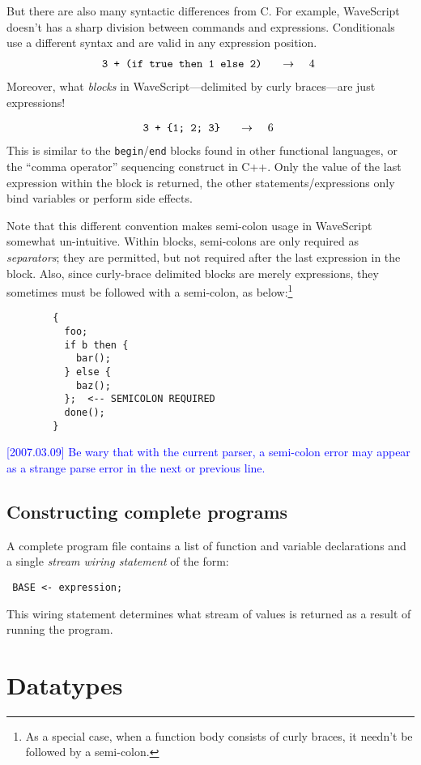\documentclass[twocolumn]{report}
\newcommand{\rednote}[1]{{\textcolor{blue}{#1}}}
\newcommand{\evalsto}[2]{\[ \begin{array}{rcl}
$\tt #1 $&$ \arr $&$ #2 $
\end{array} \]}
\newcommand{\arr}{\ensuremath{\rightarrow}}
\newenvironment{wscode}{\begin{center}\tt}{\end{center}}
\begin{document}
But there are also many syntactic differences from C.  For example,
WaveScript doesn't has a sharp division between commands and
expressions.  Conditionals use a different syntax and are valid in any
expression position.
%
\evalsto{3 + (if true then 1 else 2)} {4}
%
Moreover, what {\em blocks} in WaveScript---delimited by curly
braces---are just expressions!

\evalsto{3 + \{1; 2; 3\}} {6}
%
This is similar to the {\tt begin}/{\tt end} blocks found in other
functional languages, or the ``comma operator'' sequencing construct
in C++.  Only the value of the last expression within the block is
returned, the other statements/expressions only bind variables or
perform side effects.

Note that this different convention makes semi-colon usage in
WaveScript somewhat un-intuitive.  Within blocks, semi-colons are only
required as {\em separators}; they are permitted, but not required
after the last expression in the block.  Also, since curly-brace
delimited blocks are merely expressions, they sometimes must be
followed with a semi-colon, as below:\footnote{As a special case, when
a function body consists of curly braces, it needn't be followed by a semi-colon.}
%
\vspace{-5mm}
\begin{verbatim}
        {
          foo;
          if b then {
            bar();
          } else {
            baz();
          };  <-- SEMICOLON REQUIRED
          done();
        }
\end{verbatim}

\rednote{[2007.03.09] Be wary that with the current parser, a
  semi-colon error may appear as a strange parse error in the next
  or previous line.}

\subsection{Constructing complete programs}

A complete program file contains a list of function and variable
declarations and a single {\em stream wiring statement} of the form:
\begin{wscode}
BASE <- expression;
\end{wscode}
This wiring statement determines what stream of values is returned as
a result of running the program.



\section{Datatypes}
\end{document}
